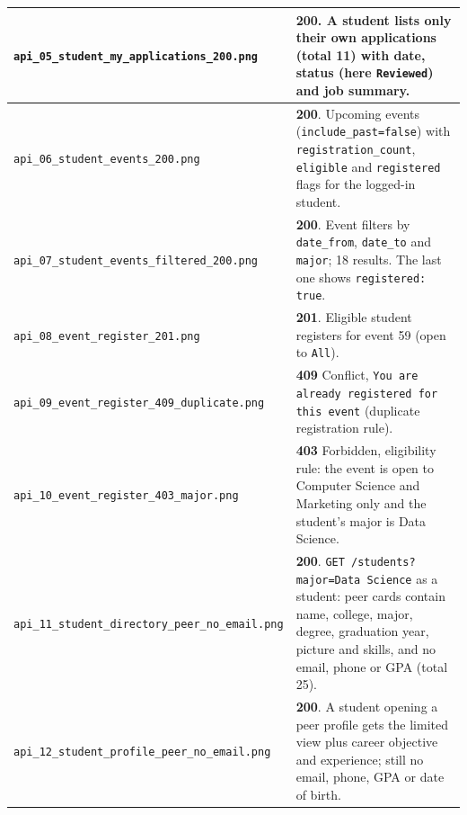 \documentclass[11pt,letterpaper]{article}
\newcommand{\code}[1]{\texttt{#1}}
\begin{document}
{\begin{longtable}{>{\raggedright\arraybackslash}p{}>{\raggedright\arraybackslash}p{}}
\code{api\_\allowbreak{}05\_\allowbreak{}student\_\allowbreak{}my\_\allowbreak{}applications\_\allowbreak{}200.\allowbreak{}png} & \textbf{200}. A student lists only their own applications (total 11) with date, status (here \code{Reviewed}) and job summary. \\ \hline
\code{api\_\allowbreak{}06\_\allowbreak{}student\_\allowbreak{}events\_\allowbreak{}200.\allowbreak{}png} & \textbf{200}. Upcoming events (\code{include\_\allowbreak{}past=\allowbreak{}false}) with \code{registration\_\allowbreak{}count}, \code{eligible} and \code{registered} flags for the logged-in student. \\ \hline
\code{api\_\allowbreak{}07\_\allowbreak{}student\_\allowbreak{}events\_\allowbreak{}filtered\_\allowbreak{}200.\allowbreak{}png} & \textbf{200}. Event filters by \code{date\_\allowbreak{}from}, \code{date\_\allowbreak{}to} and \code{major}; 18 results. The last one shows \code{registered:\allowbreak{} true}. \\ \hline
\code{api\_\allowbreak{}08\_\allowbreak{}event\_\allowbreak{}register\_\allowbreak{}201.\allowbreak{}png} & \textbf{201}. Eligible student registers for event 59 (open to \code{All}). \\ \hline
\code{api\_\allowbreak{}09\_\allowbreak{}event\_\allowbreak{}register\_\allowbreak{}409\_\allowbreak{}duplicate.\allowbreak{}png} & \textbf{409} Conflict, \code{You are already registered for this event} (duplicate registration rule). \\ \hline
\code{api\_\allowbreak{}10\_\allowbreak{}event\_\allowbreak{}register\_\allowbreak{}403\_\allowbreak{}major.\allowbreak{}png} & \textbf{403} Forbidden, eligibility rule: the event is open to Computer Science and Marketing only and the student's major is Data Science. \\ \hline
\code{api\_\allowbreak{}11\_\allowbreak{}student\_\allowbreak{}directory\_\allowbreak{}peer\_\allowbreak{}no\_\allowbreak{}email.\allowbreak{}png} & \textbf{200}. \code{GET /\allowbreak{}students?major=\allowbreak{}Data Science} as a student: peer cards contain name, college, major, degree, graduation year, picture and skills, and no email, phone or GPA (total 25). \\ \hline
\code{api\_\allowbreak{}12\_\allowbreak{}student\_\allowbreak{}profile\_\allowbreak{}peer\_\allowbreak{}no\_\allowbreak{}email.\allowbreak{}png} & \textbf{200}. A student opening a peer profile gets the limited view plus career objective and experience; still no email, phone, GPA or date of birth. \\ \hline

\end{longtable}}
\end{document}
